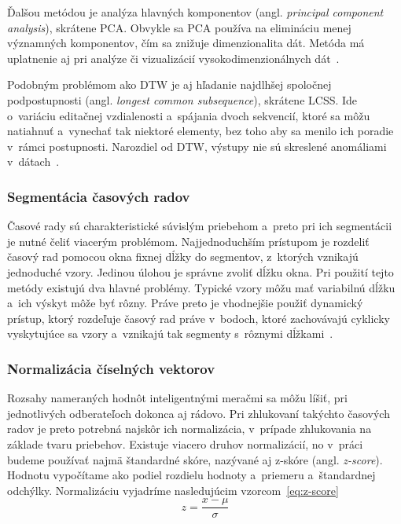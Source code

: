 \documentclass[a4paper,twoside,slovak,12pt,appendix]{article}
\begin{document}
Ďalšou metódou je analýza hlavných komponentov (angl. \textit{principal
component analysis}), skrátene PCA. Obvykle sa PCA používa na elimináciu menej
významných komponentov, čím sa znižuje dimenzionalita dát. Metóda má uplatnenie
aj pri analýze či vizualizácií vysokodimenzionálnych dát~\cite{Fu2011}.

Podobným problémom ako DTW je aj hľadanie najdlhšej spoločnej podpostupnosti
(angl. \textit{longest common subsequence}), skrátene LCSS. Ide o~variáciu
editačnej vzdialenosti a~spájania dvoch sekvencií, ktoré sa môžu natiahnuť
a~vynechať tak niektoré elementy, bez toho aby sa menilo ich poradie v~rámci
postupnosti. Narozdiel od DTW, výstupy nie sú skreslené anomáliami
v~dátach~\cite{Fu2011}.

\subsubsection{Segmentácia časových radov}
Časové rady sú charakteristické súvislým priebehom a~preto pri ich segmentácii
je nutné čeliť viacerým problémom. Najjednoduchším prístupom je rozdeliť časový
rad pomocou okna fixnej dĺžky do segmentov, z~ktorých vznikajú jednoduché vzory.
Jedinou úlohou je správne zvoliť dĺžku okna. Pri použití tejto metódy existujú
dva hlavné problémy. Typické vzory môžu mať variabilnú dĺžku a~ich výskyt môže
byť rôzny. Práve preto je vhodnejšie použiť dynamický prístup, ktorý rozdeľuje
časový rad práve v~bodoch, ktoré zachovávajú cyklicky vyskytujúce sa vzory
a~vznikajú tak segmenty s~rôznymi dĺžkami~\cite{Fu2011}.

\subsubsection{Normalizácia číselných vektorov}
Rozsahy nameraných hodnôt inteligentnými meračmi sa môžu líšiť, pri jednotlivých
odberateľoch dokonca aj rádovo. Pri zhlukovaní takýchto časových radov je preto
potrebná najskôr ich normalizácia, v~prípade zhlukovania na základe tvaru
priebehov. Existuje viacero druhov normalizácií, no v~práci budeme používať
najmä štandardné skóre, nazývané aj z-skóre (angl. \textit{z-score}). Hodnotu
vypočítame ako podiel rozdielu hodnoty a~priemeru a~štandardnej odchýlky.
Normalizáciu vyjadríme nasledujúcim
vzorcom~\ref{eq:z-score}~\cite{Arampatzis2009}
\begin{equation}
	\label{eq:z-score}
  z = \frac{x-\mu}{\sigma}
\end{equation}

\end{document}
